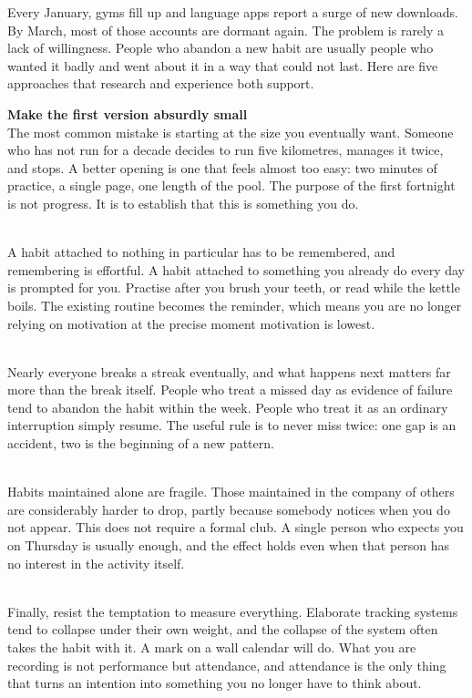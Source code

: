

\begin{ibtextbody}
  Every January, gyms fill up and language apps report a surge of new
  downloads. By March, most of those accounts are dormant again. The problem is
  rarely a lack of willingness. People who abandon a new habit are usually
  people who wanted it badly and went about it in a way that could not last.
  Here are five approaches that research and experience both support.

  \textbf{Make the first version absurdly small}\\
  The most common mistake is starting at the size you eventually want. Someone
  who has not run for a decade decides to run five kilometres, manages it
  twice, and stops. A better opening is one that feels almost too easy: two
  minutes of practice, a single page, one length of the pool. The purpose of
  the first fortnight is not progress. It is to establish that this is
  something you do.

  \\
  A habit attached to nothing in particular has to be remembered, and
  remembering is effortful. A habit attached to something you already do every
  day is prompted for you. Practise after you brush your teeth, or read while
  the kettle boils. The existing routine becomes the reminder, which means you
  are no longer relying on motivation at the precise moment motivation is
  lowest.

  \\
  Nearly everyone breaks a streak eventually, and what happens next matters far
  more than the break itself. People who treat a missed day as evidence of
  failure tend to abandon the habit within the week. People who treat it as an
  ordinary interruption simply resume. The useful rule is to never miss twice:
  one gap is an accident, two is the beginning of a new pattern.

  \\
  Habits maintained alone are fragile. Those maintained in the company of
  others are considerably harder to drop, partly because somebody notices when
  you do not appear. This does not require a formal club. A single person who
  expects you on Thursday is usually enough, and the effect holds even when
  that person has no interest in the activity itself.

  \\
  Finally, resist the temptation to measure everything. Elaborate tracking
  systems tend to collapse under their own weight, and the collapse of the
  system often takes the habit with it. A mark on a wall calendar will do. What
  you are recording is not performance but attendance, and attendance is the
  only thing that turns an intention into something you no longer have to think
  about.
\end{ibtextbody}

